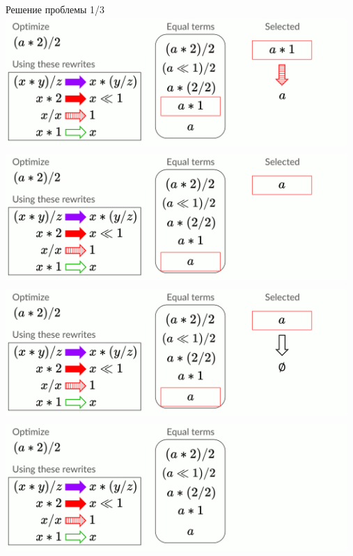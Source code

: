 \documentclass[aspectratio=169
  , xcolor={svgnames}
  , russian  %
  ]{beamer}
\begin{document}
\begin{frame}{Решение проблемы 1/3}
{   } 
    {
        \centering
        \includegraphics[width=13cm, height=5cm]{misc/egraphs_images/naive/n-13.jpg}
   } 
    {
        \centering
        \includegraphics[width=13cm, height=5cm]{misc/egraphs_images/naive/n-14.jpg}
   } 
    {
        \centering
        \includegraphics[width=13cm, height=5cm]{misc/egraphs_images/naive/n-15.jpg}
   } 
    {
        \centering
        \includegraphics[width=13cm, height=5cm]{misc/egraphs_images/naive/n-16.jpg}
   } 
\end{frame}
\end{document}
